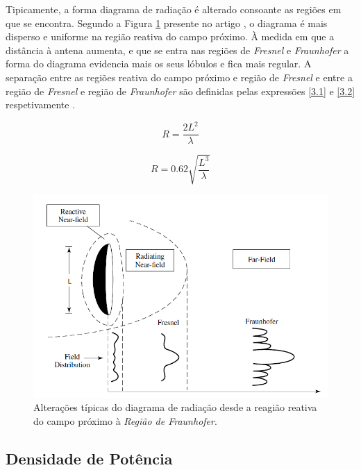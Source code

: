 Tipicamente, a forma diagrama de radiação é alterado consoante as regiões em que se encontra. Segundo a Figura \ref{fig:alt_tipicas_regioes} presente no artigo \cite{Y.RahmatL.WilliamsR.Yoccarino1995}, o diagrama é mais disperso e uniforme na região reativa do campo próximo. À medida em que a distância à antena aumenta, e que se entra nas regiões de \textit{Fresnel} e \textit{Fraunhofer} a forma do diagrama evidencia mais os seus lóbulos e fica mais regular. A separação entre as regiões reativa do campo próximo e região de \textit{Fresnel} e entre a região de \textit{Fresnel} e região de \textit{Fraunhofer} são definidas pelas expressões \ref{3.1} e \ref{3.2} respetivamente \parencite{Y.RahmatL.WilliamsR.Yoccarino1995}.

\begin{equation} \label{3.1}
R=\dfrac{2L^{2}}{\lambda}
\end{equation}

\begin{equation} \label{3.2}
R=0.62\sqrt{\dfrac{L^{3}}{\lambda}}
\end{equation}

\begin{figure}[h]
\centering
\includegraphics[scale=0.6]{chapters/ch3/assets/alt_tipicas_regioes}
\caption[Alterações típicas da forma do diagrama de radiação]{Alterações típicas do diagrama de radiação desde a reagião reativa do campo próximo à \textit{Região de Fraunhofer}. \parencite{Y.RahmatL.WilliamsR.Yoccarino1995}}
\label{fig:alt_tipicas_regioes}
\end{figure}


\subsection*{Densidade de Potência}

